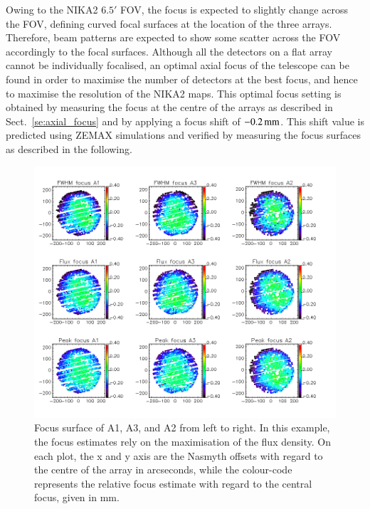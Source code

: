 \documentclass[traditionalabstract]{aa}
\begin{document}
{\begin{appendix}
Owing to the NIKA2 $6.5'$ FOV, the focus is expected to
slightly change across the FOV, defining curved focal surfaces at the
location of the three arrays. Therefore, beam patterns are expected to
show some scatter across the FOV accordingly to the focal
surfaces. Although all the detectors on a flat array cannot be
individually focalised, an optimal axial focus of the telescope can be
found in order to maximise the number of detectors at the best focus, and hence to
maximise the resolution of the NIKA2 maps.
This optimal focus setting is obtained by measuring the focus at the
centre of the arrays as described in Sect.~\ref{se:axial_focus} and by applying
a focus shift of $-0.2\,\rm{mm}$. This shift value is 
predicted using ZEMAX simulations and verified by measuring
the focus surfaces as described in the following.

\begin{figure}[!thbp]
\begin{center}
  \includegraphics[trim={0, 9.5cm, 0, 9.5cm}, clip=true, width=\linewidth]{Figures/fov_focus_mv_5.png}
\caption[Focus surfaces]{Focus surface of A1, A3, and A2 from left to
  right. In this example, the focus estimates rely on the maximisation of the flux
  density. On each plot, the x and y axis are the Nasmyth offsets
  with regard to the centre of the array in arcseconds, while the colour-code represents
  the relative focus estimate with regard to the central focus, given in mm.}
\label{fig:focus-surfaces}
\end{center}
\end{figure}


\end{appendix}}
\end{document}
